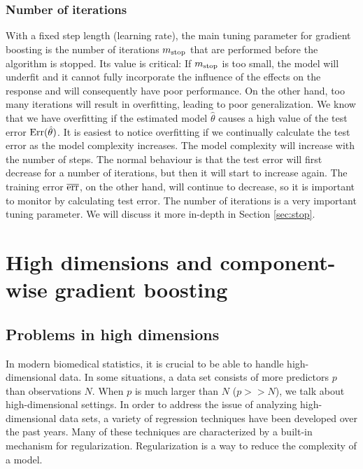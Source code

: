\subsubsection{Number of iterations}\label{subsec:iterations}
With a fixed step length (learning rate), the main tuning parameter for gradient boosting is the number of iterations $m_{\text{stop}}$ that are performed before the algorithm is stopped.
Its value is critical:
If $m_{\text{stop}}$ is too small, the model will underfit and it cannot fully incorporate the influence of the effects on the response and will consequently have poor performance.
On the other hand, too many iterations will result in overfitting, leading to poor generalization.
We know that we have overfitting if the estimated model $\hat{\theta}$ causes a high value of the test error $\text{Err}(\hat{\theta})$.
It is easiest to notice overfitting if we continually calculate the test error as the model complexity increases.
The model complexity will increase with the number of steps.
The normal behaviour is that the test error will first decrease for a number of iterations, but then it will start to increase again.
The training error $\overline{\text{err}}$, on the other hand, will continue to decrease, so it is important to monitor by calculating test error.
The number of iterations is a very important tuning parameter.
We will discuss it more in-depth in Section \ref{sec:stop}.



\section{High dimensions and component-wise gradient boosting}\label{sec:component}
\subsection{Problems in high dimensions}
In modern biomedical statistics, it is crucial to be able to handle high-dimensional data.
In some situations, a data set consists of more predictors $p$ than observations $N$.
When $p$ is much larger than $N$ ($p>>N$), we talk about high-dimensional settings.
In order to address the issue of analyzing high-dimensional data sets, a variety of regression techniques have been developed over the past years.
Many of these techniques are characterized by a built-in mechanism for regularization.
Regularization is a way to reduce the complexity of a model.

